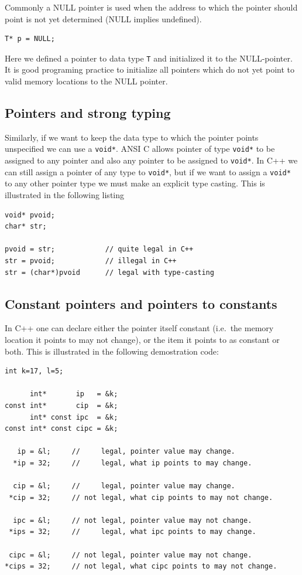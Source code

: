 Commonly a NULL pointer is used when the address to which the
pointer should point is not yet determined (NULL implies undefined).
{\small \begin{verbatim}
T* p = NULL;
\end{verbatim}}
\noindent
Here we defined a pointer to data type \verb+T+ and initialized
it to the NULL-pointer. It is good programing practice to initialize all
pointers which do not yet point to valid memory locations to the NULL
pointer.


\subsection{Pointers and strong typing}

Similarly, if we want to keep the data type to which the pointer
points unspecified we can use a \verb+void*+. ANSI C allows pointer
of type \verb+void*+ to be assigned to any pointer and also any
pointer to be assigned to \verb+void*+. In C++ we can still assign
a pointer of any type to \verb+void*+, but if we want to assign
a \verb+void*+ to any other pointer type we must make an explicit
type casting. This is illustrated in the following listing
{\small \begin{verbatim}
void* pvoid;
char* str;

pvoid = str;            // quite legal in C++
str = pvoid;            // illegal in C++
str = (char*)pvoid      // legal with type-casting
\end{verbatim}}


\subsection{Constant pointers and pointers to constants}

In C++ one can declare either the pointer itself constant (i.e.\ the memory
location it points to may not change), or the item it points to as constant
or both. This is illustrated in the following demostration code:
{\small \begin{verbatim}
int k=17, l=5;

      int*       ip   = &k;
const int*       cip  = &k;
      int* const ipc  = &k;
const int* const cipc = &k;

   ip = &l;     //     legal, pointer value may change.
  *ip = 32;     //     legal, what ip points to may change.

  cip = &l;     //     legal, pointer value may change.
 *cip = 32;     // not legal, what cip points to may not change.

  ipc = &l;     // not legal, pointer value may not change.
 *ips = 32;     //     legal, what ipc points to may change.

 cipc = &l;     // not legal, pointer value may not change.
*cips = 32;     // not legal, what cipc points to may not change.
\end{verbatim}}

